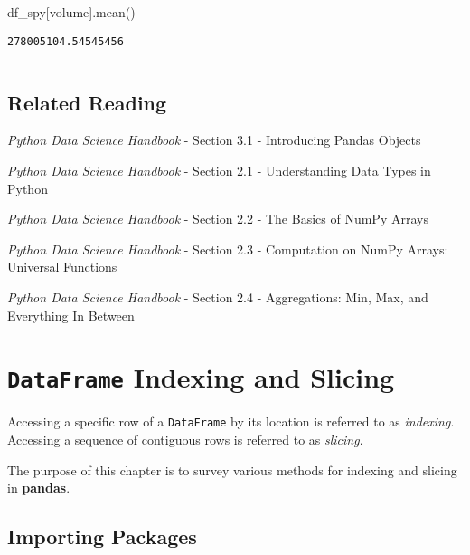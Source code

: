 \documentclass[
  letterpaper,
  DIV=11,
  numbers=noendperiod]{scrreprt}
\newenvironment{Shaded}{\begin{snugshade}}{\end{snugshade}}
\newcommand{\NormalTok}[1]{\textcolor[rgb]{0.00,0.23,0.31}{#1}}
\newcommand{\StringTok}[1]{\textcolor[rgb]{0.13,0.47,0.30}{#1}}
\begin{document}
\begin{Shaded}
\begin{Highlighting}[]
\NormalTok{df\_spy[}\StringTok{\textquotesingle{}volume\textquotesingle{}}\NormalTok{].mean()}
\end{Highlighting}
\end{Shaded}

\begin{verbatim}
278005104.54545456
\end{verbatim}

\begin{center}\rule{0.5\linewidth}{0.5pt}\end{center}

\hypertarget{related-reading}{%
\section{Related Reading}\label{related-reading}}

\emph{Python Data Science Handbook} - Section 3.1 - Introducing Pandas
Objects

\emph{Python Data Science Handbook} - Section 2.1 - Understanding Data
Types in Python

\emph{Python Data Science Handbook} - Section 2.2 - The Basics of NumPy
Arrays

\emph{Python Data Science Handbook} - Section 2.3 - Computation on NumPy
Arrays: Universal Functions

\emph{Python Data Science Handbook} - Section 2.4 - Aggregations: Min,
Max, and Everything In Between


\hypertarget{dataframe-indexing-and-slicing}{%
\chapter{\texorpdfstring{\texttt{DataFrame} Indexing and
Slicing}{DataFrame Indexing and Slicing}}\label{dataframe-indexing-and-slicing}}

Accessing a specific row of a \texttt{DataFrame} by its location is
referred to as \emph{indexing}. Accessing a sequence of contiguous rows
is referred to as \emph{slicing}.

The purpose of this chapter is to survey various methods for indexing
and slicing in \textbf{pandas}.

\hypertarget{importing-packages-2}{%
\section{Importing Packages}\label{importing-packages-2}}
\end{document}
